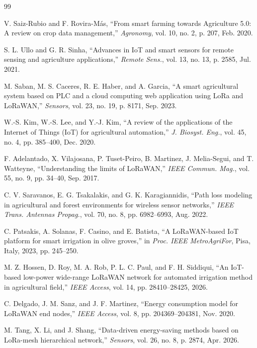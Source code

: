 \documentclass[conference]{IEEEtran}
\begin{document}
\begin{thebibliography}{99}

V. Saiz-Rubio and F. Rovira-M\'as, ``From smart farming towards Agriculture 5.0: A review on crop data management,'' \emph{Agronomy}, vol. 10, no. 2, p. 207, Feb. 2020.

S. L. Ullo and G. R. Sinha, ``Advances in IoT and smart sensors for remote sensing and agriculture applications,'' \emph{Remote Sens.}, vol. 13, no. 13, p. 2585, Jul. 2021.

M. Saban, M. S. Caceres, R. E. Haber, and A. Garcia, ``A smart agricultural system based on PLC and a cloud computing web application using LoRa and LoRaWAN,'' \emph{Sensors}, vol. 23, no. 19, p. 8171, Sep. 2023.

W.-S. Kim, W.-S. Lee, and Y.-J. Kim, ``A review of the applications of the Internet of Things (IoT) for agricultural automation,'' \emph{J. Biosyst. Eng.}, vol. 45, no. 4, pp. 385--400, Dec. 2020.

F. Adelantado, X. Vilajosana, P. Tuset-Peiro, B. Martinez, J. Melia-Segui, and T. Watteyne, ``Understanding the limits of LoRaWAN,'' \emph{IEEE Commun. Mag.}, vol. 55, no. 9, pp. 34--40, Sep. 2017.

C. V. Saravanos, E. G. Tsakalakis, and G. K. Karagiannidis, ``Path loss modeling in agricultural and forest environments for wireless sensor networks,'' \emph{IEEE Trans. Antennas Propag.}, vol. 70, no. 8, pp. 6982--6993, Aug. 2022.

C. Patsakis, A. Solanas, F. Casino, and E. Batista, ``A LoRaWAN-based IoT platform for smart irrigation in olive groves,'' in \emph{Proc. IEEE MetroAgriFor}, Pisa, Italy, 2023, pp. 245--250.

M. Z. Hossen, D. Roy, M. A. Rob, P. L. C. Paul, and F. H. Siddiqui, ``An IoT-based low-power wide-range LoRaWAN network for automated irrigation method in agricultural field,'' \emph{IEEE Access}, vol. 14, pp. 28410--28425, 2026.

C. Delgado, J. M. Sanz, and J. F. Martinez, ``Energy consumption model for LoRaWAN end nodes,'' \emph{IEEE Access}, vol. 8, pp. 204369--204381, Nov. 2020.

M. Tang, X. Li, and J. Shang, ``Data-driven energy-saving methods based on LoRa-mesh hierarchical network,'' \emph{Sensors}, vol. 26, no. 8, p. 2874, Apr. 2026.


\end{thebibliography}
\end{document}
